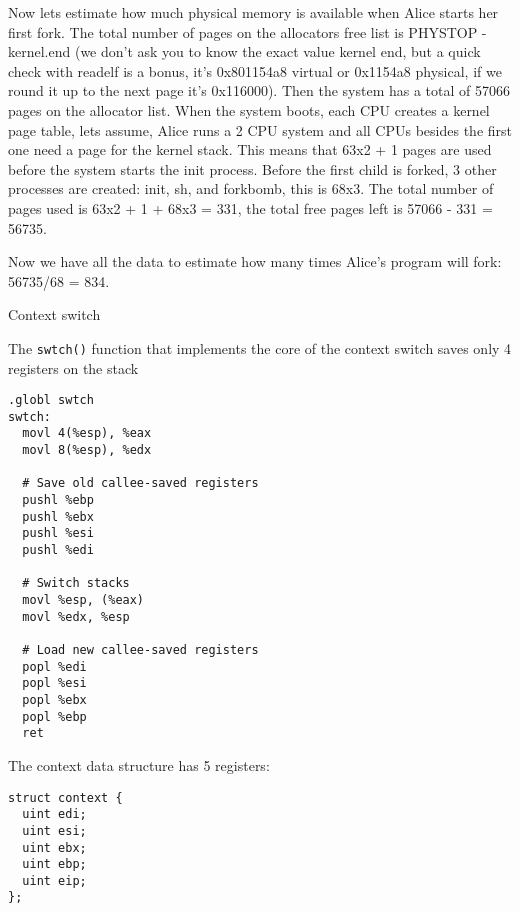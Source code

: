 \documentclass[11pt]{exam}
\begin{document}
\begin{questions}
\begin{parts}
	Now lets estimate how much physical memory is available when Alice starts her first fork. The total number of pages on the allocators free list is PHYSTOP - kernel.end (we 
	don't ask you to know the exact value kernel end, but a quick check with readelf is a bonus, it's 0x801154a8 virtual or 0x1154a8 physical, if we round it up to the next page it's 
	0x116000). Then the system has a total of 57066 pages on the allocator list. When the system boots, each CPU creates a kernel page table, lets assume, Alice runs a 2 CPU system and 
	all CPUs besides the first one need a page for the kernel stack. This means that 63x2 + 1 pages are used before the system starts the init process. Before the first child is forked, 
	3 other processes are created: init, sh, and forkbomb, this is 68x3. The total number of pages used is 63x2 + 1 + 68x3 = 331, the total free pages left is 57066 - 331 = 56735. 

	Now we have all the data to estimate how many times Alice's program will fork: 56735/68 = 834.

\iffalse
\begin{verbatim}
forked pid:811
forked pid:812
fork failed, pid:-1
\end{verbatim}
\fi
\fi

\vfill

\end{parts}


\newpage

\addpoints
\question Context switch

The \texttt{swtch()} function that implements the core of the context switch 
saves only 4 registers on the stack

\begin{verbatim}
.globl swtch
swtch:
  movl 4(%esp), %eax
  movl 8(%esp), %edx

  # Save old callee-saved registers
  pushl %ebp
  pushl %ebx
  pushl %esi
  pushl %edi

  # Switch stacks
  movl %esp, (%eax)
  movl %edx, %esp

  # Load new callee-saved registers
  popl %edi
  popl %esi
  popl %ebx
  popl %ebp
  ret
\end{verbatim}

The context data structure has 5 registers: 

\begin{verbatim}
struct context {
  uint edi;
  uint esi;
  uint ebx;
  uint ebp;
  uint eip;
};
\end{verbatim}


\end{questions}
\end{document}
